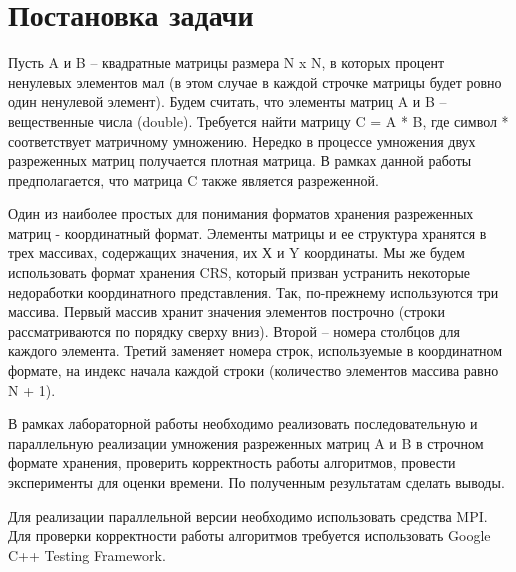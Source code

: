 \documentclass{report}
\begin{document}
\section*{Постановка задачи}
Пусть A и B – квадратные матрицы размера N x N, в которых процент ненулевых элементов мал (в этом случае в каждой строчке матрицы будет ровно один ненулевой элемент). Будем считать, что элементы матриц A и B – вещественные числа (double). Требуется найти матрицу C = A * B, где символ * соответствует матричному умножению. Нередко в процессе умножения двух разреженных матриц получается плотная матрица. В рамках данной работы предполагается, что матрица C также является разреженной.
\par
Один из наиболее простых для понимания форматов хранения разреженных матриц - координатный формат. Элементы матрицы и ее структура хранятся в трех массивах, содержащих значения, их Х и Y координаты. Мы же будем использовать формат хранения CRS, который призван устранить некоторые недоработки координатного представления. Так, по-прежнему используются три массива. Первый массив хранит значения элементов построчно
(строки рассматриваются по порядку сверху вниз). Второй – номера столбцов для каждого элемента. Третий заменяет номера строк, используемые в координатном формате, на индекс начала каждой строки (количество элементов массива равно N + 1).
\par
В рамках лабораторной работы необходимо реализовать последовательную и параллельную реализации умножения разреженных матриц A и B в строчном формате хранения, проверить корректность работы алгоритмов, провести эксперименты для оценки времени. По полученным результатам сделать выводы.
\par Для реализации параллельной версии необходимо использовать средства MPI. Для проверки корректности работы алгоритмов требуется использовать Google C++ Testing Framework.
\newpage

\end{document}
